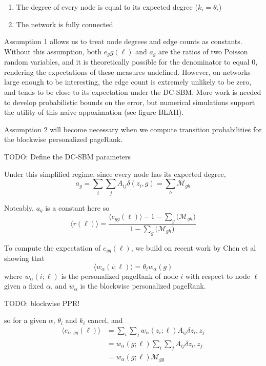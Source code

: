 \documentclass[12pt]{article}
\begin{document}
\begin{enumerate}
  \item The degree of every node is equal to its expected degree ($k_i = \theta_i$)
  \item The network is fully connected
\end{enumerate}

Assumption 1 allows us to treat node degrees and edge counts as constants.  Without this assumption, both $e_gg(\ell)$ and $a_g$ are the ratios of two Poisson random variables, and it is theoretically possible for the denominator to equal 0, rendering the expectations of these measures undefined.  However, on networks large enough to be interesting, the edge count is extremely unlikely to be zero, and tends to be close to its expectation under the DC-SBM.  More work is needed to develop probabilistic bounds on the error, but numerical simulations support the utility of this naive appoximation (see figure BLAH).    

Assumption 2 will become necessary when we compute transition probabilities for the blockwise personalized pageRank. 

TODO: Define the DC-SBM parameters

Under this simplified regime, since every node has its expected degree,
\begin{equation}
  a_g = \sum_i \sum_j A_{ij} \delta(z_i, g) = \sum_h \mathcal{M}_{gh}
\end{equation}

Noteably, $a_g$ is a constant here so 
\begin{equation}
  \langle r(\ell) \rangle = \frac{\langle e_{gg}(\ell) \rangle - 1 - \sum_g \big( \mathcal{M}_{gh} \big)}{1 - \sum_g \big( \mathcal{M}_{gh} \big)}
\end{equation}

To compute the expectation of $e_{gg}(\ell)$, we build on recent work by Chen et al \cite{chen:2020} showing that
\begin{equation}
  \langle w_\alpha (i ; \ell) \rangle = \theta_i w_\alpha(g)
\end{equation}
where $w_\alpha(i;\ell)$ is the personalized pageRank of node $i$ with respect to node $\ell$ given a fixed $\alpha$, and $w_\alpha$ is the blockwise personalized pageRank.

TODO: blockwise PPR! 

so for a given $\alpha$, $\theta_i$ and $k_i$ cancel, and
\begin{equation}
  \begin{aligned}
    \langle e_{\alpha, gg}(\ell) \rangle &= \sum_i \sum_j w_\alpha(z_i; \ell) A_{ij} \delta{z_i, z_j} \\
    &= w_\alpha(g; \ell) \sum_i \sum_j A_{ij} \delta{z_i, z_j} \\
    &= w_\alpha(g; \ell) \mathcal{M}_{gg}
  \end{aligned}
\end{equation}
\end{document}
